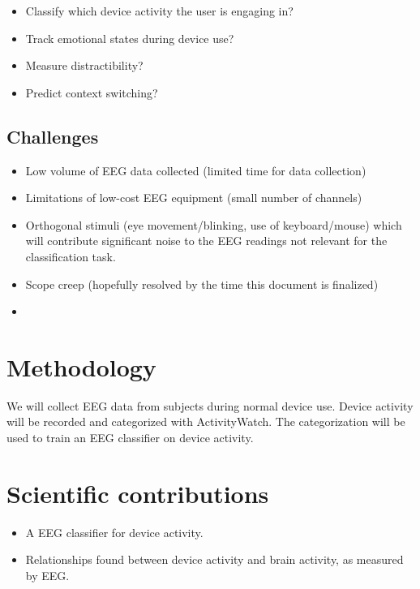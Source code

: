 \documentclass{IEEEtran}
\begin{document}
\begin{itemize}
    \item Classify which device activity the user is engaging in?
    \item Track emotional states during device use?
    \item Measure distractibility?
    \item Predict context switching?
\end{itemize}

\subsection{Challenges}

\begin{itemize}
    \item Low volume of EEG data collected (limited time for data collection)
    \item Limitations of low-cost EEG equipment (small number of channels)
    \item Orthogonal stimuli (eye movement/blinking, use of keyboard/mouse) which will contribute significant noise to the EEG readings not relevant for the classification task.
    \item Scope creep (hopefully resolved by the time this document is finalized)
    \item {}
\end{itemize}

\section{Methodology}

We will collect EEG data from subjects during normal device use. Device activity will be recorded and categorized with ActivityWatch. The categorization will be used to train an EEG classifier on device activity.

\section{Scientific contributions}

\begin{itemize}
  \item A EEG classifier for device activity.
  \item Relationships found between device activity and brain activity, as measured by EEG\@.
\end{itemize}
\end{document}
